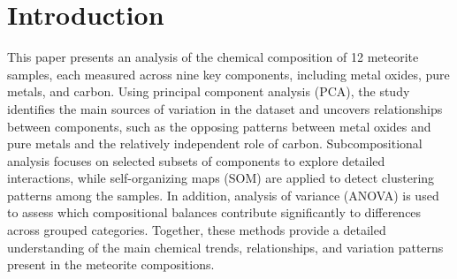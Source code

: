 \section{Introduction}


This paper presents an analysis of the chemical composition of 12 meteorite samples, each measured across nine key components, including metal oxides, pure metals, and carbon. Using principal component analysis (PCA), the study identifies the main sources of variation in the dataset and uncovers relationships between components, such as the opposing patterns between metal oxides and pure metals and the relatively independent role of carbon. Subcompositional analysis focuses on selected subsets of components to explore detailed interactions, while self-organizing maps (SOM) are applied to detect clustering patterns among the samples. In addition, analysis of variance (ANOVA) is used to assess which compositional balances contribute significantly to differences across grouped categories. Together, these methods provide a detailed understanding of the main chemical trends, relationships, and variation patterns present in the meteorite compositions.



